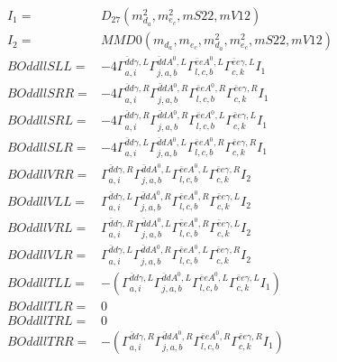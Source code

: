 \documentclass[A4,landscape]{article}
\begin{document}
\begin{align} 
I_1 = & D_{27}(m^2_{d_{{a}}}, m^2_{e_{{c}}}, mS22, mV12) \\ 
I_2 = & MMD0(m_{d_{{a}}}, m_{e_{{c}}}, m^2_{d_{{a}}}, m^2_{e_{{c}}}, mS22, mV12) \\ 
  BOddllSLL= & -4  \Gamma^{\bar{d}d \gamma ,L}_{a, i} \Gamma^{\bar{d}d A^0 ,L}_{j, a, b} \Gamma^{\bar{e}e A^0 ,L}_{l, c, b} \Gamma^{\bar{e}e \gamma ,L}_{c, k} I_1 \\ 
  BOddllSRR= & -4  \Gamma^{\bar{d}d \gamma ,R}_{a, i} \Gamma^{\bar{d}d A^0 ,R}_{j, a, b} \Gamma^{\bar{e}e A^0 ,R}_{l, c, b} \Gamma^{\bar{e}e \gamma ,R}_{c, k} I_1 \\ 
  BOddllSRL= & -4  \Gamma^{\bar{d}d \gamma ,R}_{a, i} \Gamma^{\bar{d}d A^0 ,R}_{j, a, b} \Gamma^{\bar{e}e A^0 ,L}_{l, c, b} \Gamma^{\bar{e}e \gamma ,L}_{c, k} I_1 \\ 
  BOddllSLR= & -4  \Gamma^{\bar{d}d \gamma ,L}_{a, i} \Gamma^{\bar{d}d A^0 ,L}_{j, a, b} \Gamma^{\bar{e}e A^0 ,R}_{l, c, b} \Gamma^{\bar{e}e \gamma ,R}_{c, k} I_1 \\ 
  BOddllVRR= &  \Gamma^{\bar{d}d \gamma ,R}_{a, i} \Gamma^{\bar{d}d A^0 ,L}_{j, a, b} \Gamma^{\bar{e}e A^0 ,L}_{l, c, b} \Gamma^{\bar{e}e \gamma ,R}_{c, k} I_2 \\ 
  BOddllVLL= &  \Gamma^{\bar{d}d \gamma ,L}_{a, i} \Gamma^{\bar{d}d A^0 ,R}_{j, a, b} \Gamma^{\bar{e}e A^0 ,R}_{l, c, b} \Gamma^{\bar{e}e \gamma ,L}_{c, k} I_2 \\ 
  BOddllVRL= &  \Gamma^{\bar{d}d \gamma ,R}_{a, i} \Gamma^{\bar{d}d A^0 ,L}_{j, a, b} \Gamma^{\bar{e}e A^0 ,R}_{l, c, b} \Gamma^{\bar{e}e \gamma ,L}_{c, k} I_2 \\ 
  BOddllVLR= &  \Gamma^{\bar{d}d \gamma ,L}_{a, i} \Gamma^{\bar{d}d A^0 ,R}_{j, a, b} \Gamma^{\bar{e}e A^0 ,L}_{l, c, b} \Gamma^{\bar{e}e \gamma ,R}_{c, k} I_2 \\ 
  BOddllTLL= & -( \Gamma^{\bar{d}d \gamma ,L}_{a, i} \Gamma^{\bar{d}d A^0 ,L}_{j, a, b} \Gamma^{\bar{e}e A^0 ,L}_{l, c, b} \Gamma^{\bar{e}e \gamma ,L}_{c, k} I_1) \\ 
  BOddllTLR= & 0 \\ 
  BOddllTRL= & 0 \\ 
  BOddllTRR= & -( \Gamma^{\bar{d}d \gamma ,R}_{a, i} \Gamma^{\bar{d}d A^0 ,R}_{j, a, b} \Gamma^{\bar{e}e A^0 ,R}_{l, c, b} \Gamma^{\bar{e}e \gamma ,R}_{c, k} I_1) \\ 
\end{align} 
\end{document}
